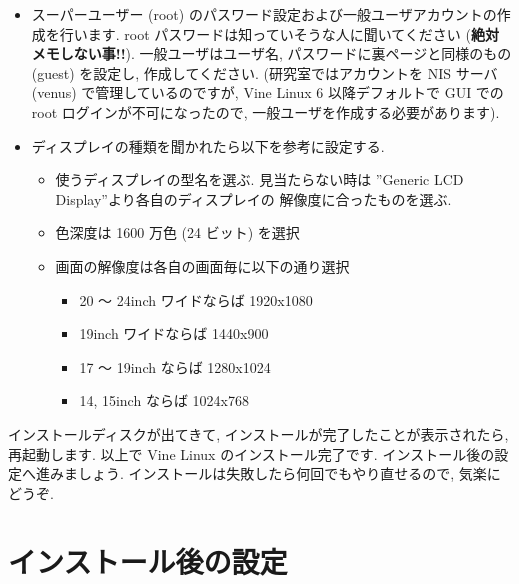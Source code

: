 \documentclass{jarticle}
\begin{document}
\begin{itemize}
	\item スーパーユーザー (root) のパスワード設定および一般ユーザアカウントの作成を行います.
	      root パスワードは知っていそうな人に聞いてください ({\bf 絶対メモしない事!!}).
	      一般ユーザはユーザ名, パスワードに裏ページと同様のもの (guest) を設定し, 作成してください.
	      (研究室ではアカウントを NIS サーバ (venus) で管理しているのですが, Vine Linux 6 以降デフォルトで
	      GUI での root ログインが不可になったので, 一般ユーザを作成する必要があります).
	\item ディスプレイの種類を聞かれたら以下を参考に設定する.
		\begin{itemize}
			\item 使うディスプレイの型名を選ぶ. 見当たらない時は
			      ''Generic LCD Display''より各自のディスプレイの
			      解像度に合ったものを選ぶ.
			\item 色深度は 1600 万色 (24 ビット) を選択
			\item 画面の解像度は各自の画面毎に以下の通り選択
			\begin{itemize}
				\item 20 〜 24inch ワイドならば 1920x1080
				\item 19inch ワイドならば 1440x900
				\item 17 〜 19inch ならば 1280x1024
				\item 14, 15inch ならば 1024x768
			\end{itemize}
		\end{itemize}
\end{itemize}

インストールディスクが出てきて, インストールが完了したことが表示されたら, 再起動します.
以上で Vine Linux のインストール完了です. インストール後の設定へ進みましょう.
インストールは失敗したら何回でもやり直せるので, 気楽にどうぞ.


\section{インストール後の設定}
\end{document}

